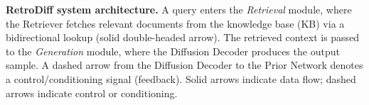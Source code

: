 \caption{\textbf{RetroDiff system architecture.} A query enters the \textit{Retrieval} module, where the Retriever fetches relevant documents from the knowledge base (KB) via a bidirectional lookup (solid double-headed arrow). The retrieved context is passed to the \textit{Generation} module, where the Diffusion Decoder produces the output sample. A dashed arrow from the Diffusion Decoder to the Prior Network denotes a control/conditioning signal (feedback). Solid arrows indicate data flow; dashed arrows indicate control or conditioning.}
